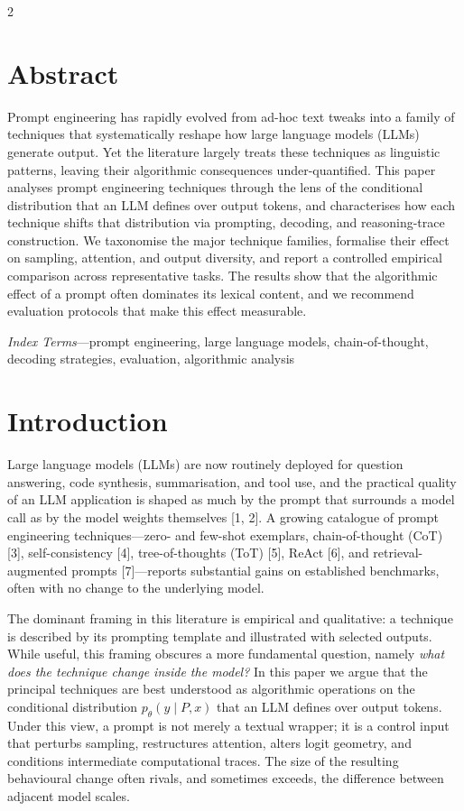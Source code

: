 \documentclass{article}
\begin{document}
\begin{multicols}{2}

\section*{Abstract}

Prompt engineering has rapidly evolved from ad-hoc text tweaks into a family of techniques that systematically reshape how large language models (LLMs) generate output. Yet the literature largely treats these techniques as linguistic patterns, leaving their algorithmic consequences under-quantified. This paper analyses prompt engineering techniques through the lens of the conditional distribution that an LLM defines over output tokens, and characterises how each technique shifts that distribution via prompting, decoding, and reasoning-trace construction. We taxonomise the major technique families, formalise their effect on sampling, attention, and output diversity, and report a controlled empirical comparison across representative tasks. The results show that the algorithmic effect of a prompt often dominates its lexical content, and we recommend evaluation protocols that make this effect measurable.

\textit{Index Terms}—prompt engineering, large language models, chain-of-thought, decoding strategies, evaluation, algorithmic analysis

\section{Introduction}

Large language models (LLMs) are now routinely deployed for question answering, code synthesis, summarisation, and tool use, and the practical quality of an LLM application is shaped as much by the prompt that surrounds a model call as by the model weights themselves [1, 2]. A growing catalogue of prompt engineering techniques—zero- and few-shot exemplars, chain-of-thought (CoT) [3], self-consistency [4], tree-of-thoughts (ToT) [5], ReAct [6], and retrieval-augmented prompts [7]—reports substantial gains on established benchmarks, often with no change to the underlying model.

The dominant framing in this literature is empirical and qualitative: a technique is described by its prompting template and illustrated with selected outputs. While useful, this framing obscures a more fundamental question, namely \textit{what does the technique change inside the model?} In this paper we argue that the principal techniques are best understood as algorithmic operations on the conditional distribution $p_\theta(y \mid P, x)$ that an LLM defines over output tokens. Under this view, a prompt is not merely a textual wrapper; it is a control input that perturbs sampling, restructures attention, alters logit geometry, and conditions intermediate computational traces. The size of the resulting behavioural change often rivals, and sometimes exceeds, the difference between adjacent model scales.


\end{multicols}
\end{document}
